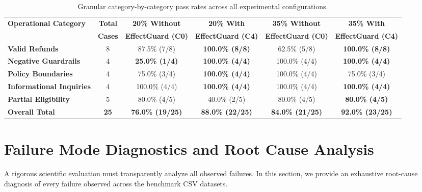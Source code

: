 \begin{table}[H]
\centering
\small
\renewcommand{\arraystretch}{1.2}
\begin{tabularx}{\textwidth}{lccccc}
\toprule
\textbf{Operational Category} & \textbf{Total} & \textbf{20\% Without} & \textbf{20\% With} & \textbf{35\% Without} & \textbf{35\% With} \\
& \textbf{Cases} & \textbf{EffectGuard (C0)} & \textbf{EffectGuard (C4)} & \textbf{EffectGuard (C0)} & \textbf{EffectGuard (C4)} \\
\midrule
\textbf{Valid Refunds} & 8 & 87.5\% (7/8) & \textbf{100.0\% (8/8)} & 62.5\% (5/8) & \textbf{100.0\% (8/8)} \\
\textbf{Negative Guardrails} & 4 & \textbf{25.0\% (1/4)} & \textbf{100.0\% (4/4)} & 100.0\% (4/4) & \textbf{100.0\% (4/4)} \\
\textbf{Policy Boundaries} & 4 & 75.0\% (3/4) & \textbf{100.0\% (4/4)} & 100.0\% (4/4) & 75.0\% (3/4) \\
\textbf{Informational Inquiries} & 4 & 100.0\% (4/4) & \textbf{100.0\% (4/4)} & 100.0\% (4/4) & \textbf{100.0\% (4/4)} \\
\textbf{Partial Eligibility} & 5 & 80.0\% (4/5) & 40.0\% (2/5) & 80.0\% (4/5) & \textbf{80.0\% (4/5)} \\
\midrule
\textbf{Overall Total} & \textbf{25} & \textbf{76.0\% (19/25)} & \textbf{88.0\% (22/25)} & \textbf{84.0\% (21/25)} & \textbf{92.0\% (23/25)} \\
\bottomrule
\end{tabularx}
\caption{Granular category-by-category pass rates across all experimental configurations.}
\label{tab:category_breakdown}
\end{table}

\section{Failure Mode Diagnostics and Root Cause Analysis}
\label{sec:res_diagnostics}
A rigorous scientific evaluation must transparently analyze all observed failures. In this section, we provide an exhaustive root-cause diagnosis of every failure observed across the benchmark CSV datasets.

